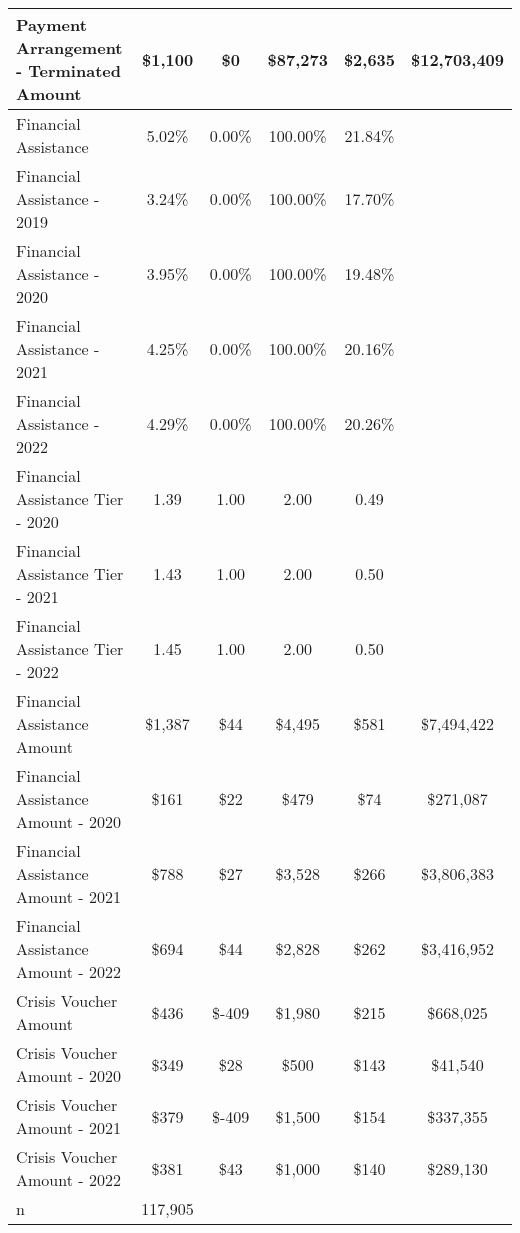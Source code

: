 \begin{tabular}{l|c|c|c|c|c}
\quad Payment Arrangement - Terminated Amount & \$1,100 & \$0 & \$87,273 & \$2,635 & \$12,703,409 \\
\midrule 
Financial Assistance & 5.02\% & 0.00\% & 100.00\% & 21.84\% \\
\quad Financial Assistance - 2019 & 3.24\% & 0.00\% & 100.00\% & 17.70\% \\
\quad Financial Assistance - 2020 & 3.95\% & 0.00\% & 100.00\% & 19.48\% \\
\quad Financial Assistance - 2021 & 4.25\% & 0.00\% & 100.00\% & 20.16\% \\
\quad Financial Assistance - 2022 & 4.29\% & 0.00\% & 100.00\% & 20.26\% \\
\midrule 
Financial Assistance Tier - 2020 & 1.39 & 1.00 & 2.00 & 0.49 \\
Financial Assistance Tier - 2021 & 1.43 & 1.00 & 2.00 & 0.50 \\
Financial Assistance Tier - 2022 & 1.45 & 1.00 & 2.00 & 0.50 \\
\midrule 
Financial Assistance Amount & \$1,387 & \$44 & \$4,495 & \$581 & \$7,494,422 \\
\quad Financial Assistance Amount - 2020 & \$161 & \$22 & \$479 & \$74 & \$271,087 \\
\quad Financial Assistance Amount - 2021 & \$788 & \$27 & \$3,528 & \$266 & \$3,806,383 \\
\quad Financial Assistance Amount - 2022 & \$694 & \$44 & \$2,828 & \$262 & \$3,416,952 \\
\midrule 
Crisis Voucher Amount & \$436 & \$-409 & \$1,980 & \$215 & \$668,025 \\
\quad Crisis Voucher Amount - 2020 & \$349 & \$28 & \$500 & \$143 & \$41,540 \\
\quad Crisis Voucher Amount - 2021 & \$379 & \$-409 & \$1,500 & \$154 & \$337,355 \\
\quad Crisis Voucher Amount - 2022 & \$381 & \$43 & \$1,000 & \$140 & \$289,130 \\
\midrule 
n & 117,905 &  &  &  &  \\
\midrule 
\bottomrule 
\end{tabular}
